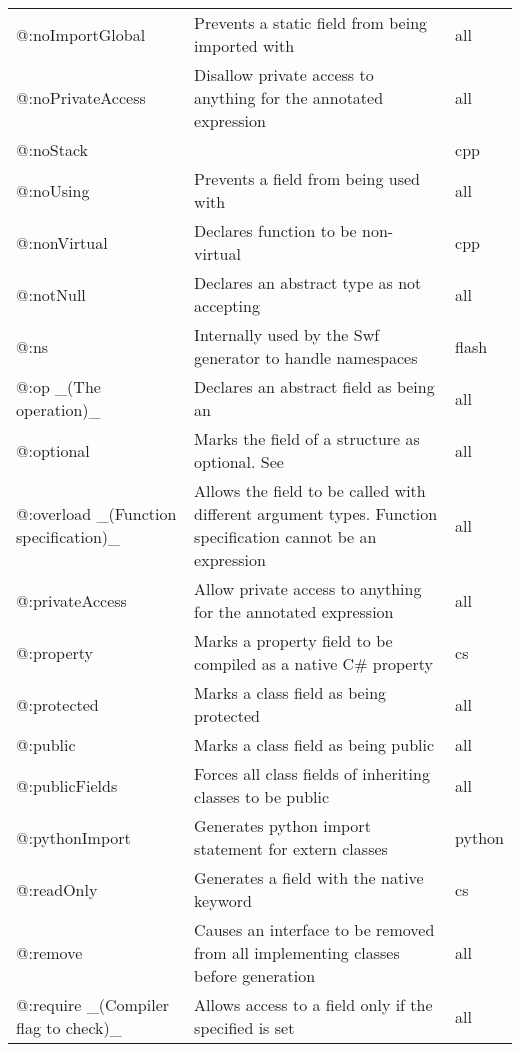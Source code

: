 \begin{center}
\begin{tabular}{| l | l | l |}
	@:noImportGlobal  &  Prevents a static field from being imported with \expr{import Class.*}  &  all \\
	@:noPrivateAccess  &  Disallow private access to anything for the annotated expression  &  all \\
	@:noStack &     &  cpp \\
	@:noUsing &  Prevents a field from being used with \expr{using}  &  all \\
	@:nonVirtual &  Declares function to be non-virtual  &  cpp \\
	@:notNull &  Declares an abstract type as not accepting \tref{\expr{null} values}{types-nullability}  &  all \\
	@:ns  &  Internally used by the Swf generator to handle namespaces   &  flash \\
	@:op \_(The operation)\_  &   Declares an abstract field as being an \tref{operator overload}{types-abstract-operator-overloading}  &  all \\
	@:optional  &  Marks the field of a structure as optional. See \tref{Optional Arguments}{types-nullability-optional-arguments}  &  all \\
	@:overload \_(Function specification)\_  &  Allows the field to be called with different argument types. Function specification cannot be an expression  &  all \\
	@:privateAccess  &  Allow private access to anything for the annotated expression  &  all \\
	@:property  &  Marks a property field to be compiled as a native C\# property   &  cs \\
	@:protected  &  Marks a class field as being protected  &  all \\
	@:public  &  Marks a class field as being public  &  all \\
	@:publicFields  &  Forces all class fields of inheriting classes to be public  &  all \\
	@:pythonImport  &  Generates python import statement for extern classes  &  python \\
	@:readOnly  &  Generates a field with the \expr{readonly} native keyword   &  cs \\
	@:remove  &  Causes an interface to be removed from all implementing classes before generation  &  all \\
	@:require \_(Compiler flag to check)\_  &  Allows access to a field only if the specified \tref{compiler flag}{lf-condition-compilation} is set  &  all \\

\end{tabular}
\end{center}
